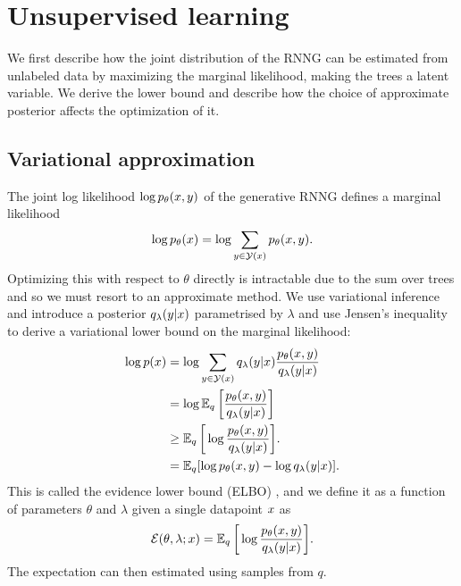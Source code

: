 \section{Unsupervised learning}
  We first describe how the joint distribution of the RNNG can be estimated from unlabeled data by maximizing the marginal likelihood, making the trees a latent variable. We derive the lower bound and describe how the choice of approximate posterior affects the optimization of it.

  \subsection{Variational approximation}
    The joint log likelihood $\log p_{\theta}(x, y)$ of the generative RNNG defines a marginal likelihood
    \begin{align*}
      \log p_{\theta}(x) = \log \sum_{y \in \mathcal{Y}(x)} p_{\theta}(x, y).
    \end{align*}
    Optimizing this with respect to $\theta$ directly is intractable due to the sum over trees and so we must resort to an approximate method. We use variational inference \citep{jordan1999vi,blei2016vi} and introduce a posterior $q_{\lambda}(y | x)$ parametrised by $\lambda$ and use Jensen's inequality to derive a variational lower bound on the marginal likelihood:
    \begin{align}
      \label{eq:lowerbound}
      \log p (x)
        &= \log \sum_{y  \in \mathcal{Y}(x)} q_{\lambda}(y |x) \frac{p_{\theta}(x,y )}{q_{\lambda}(y | x)} \nonumber  \\
        &= \log \operatorname{\mathbb{E}}_q \bigg[ \frac{p_{\theta}(x,y )}{ q_{\lambda}(y | x)} \bigg] \nonumber  \\
        &\geq \operatorname{\mathbb{E}}_q \bigg[ \log \frac{p_{\theta}(x,y )}{q_{\lambda}(y | x)} \bigg].  \nonumber \\
        &= \operatorname{\mathbb{E}}_q [\log p_{\theta}(x,y )  - \log q_{\lambda}(y | x) ].
    \end{align}
    This is called the evidence lower bound (ELBO) \citep{blei2016vi}, and we define it as a function of parameters $\theta$ and $\lambda$ given a single datapoint $x$ as
    \begin{align}
      \operatorname{\mathcal{E}}(\theta, \lambda; x) = \operatorname{\mathbb{E}}_q \bigg[ \log \frac{p_{\theta}(x,y )}{q_{\lambda}(y | x)} \bigg].
    \end{align}
    The expectation can then estimated using samples from $q$.

